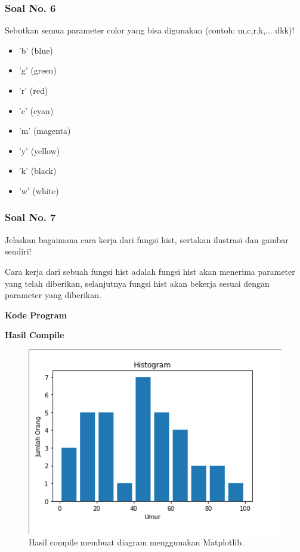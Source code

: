 \subsubsection{Soal No. 6}
\hfill \break
Sebutkan semua parameter color yang bisa digunakan (contoh:  m,c,r,k,...  dkk)!

\begin{itemize}
	\item 'b' (blue)
	\item 'g' (green)
	\item 'r' (red)
	\item 'c' (cyan)
	\item 'm' (magenta)
	\item 'y' (yellow)
	\item 'k' (black)
	\item 'w' (white)
\end{itemize}

\subsubsection{Soal No. 7}
\hfill \break
Jelaskan bagaimana cara kerja dari fungsi hist, sertakan ilustrasi dan gambar sendiri!

\hfill \break
Cara kerja dari sebuah fungsi hist adalah fungsi hist akan menerima parameter yang telah diberikan, selanjutnya fungsi hist akan bekerja sesuai dengan parameter yang diberikan.

\hfill \break
\textbf{Kode Program}



\hfill \break
\textbf{Hasil Compile}

\begin{figure}[H]
	\includegraphics[width=12cm]{figures/6/1174017/histogram.png}
	\centering
	\caption{Hasil compile membuat diagram menggunakan Matplotlib.}
\end{figure}


